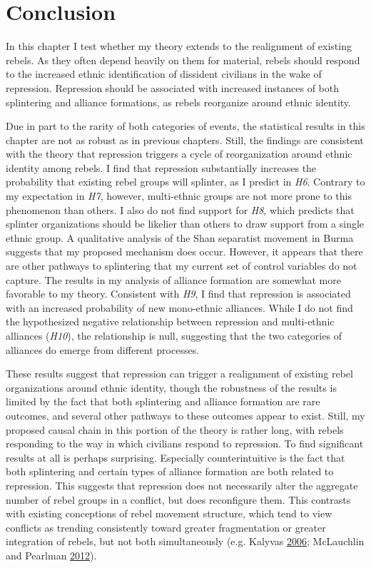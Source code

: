 \documentclass[12pt,]{book}
\theoremstyle{definition}
\theoremstyle{definition}
\theoremstyle{definition}
\theoremstyle{remark}
\begin{document}
\hypertarget{realignment-conclusion}{%
\section{Conclusion}\label{realignment-conclusion}}

In this chapter I test whether my theory extends to the realignment of
existing rebels. As they often depend heavily on them for material,
rebels should respond to the increased ethnic identification of
dissident civilians in the wake of repression. Repression should be
associated with increased instances of both splintering and alliance
formations, as rebels reorganize around ethnic identity.

Due in part to the rarity of both categories of events, the statistical
results in this chapter are not as robust as in previous chapters.
Still, the findings are consistent with the theory that repression
triggers a cycle of reorganization around ethnic identity among rebels.
I find that repression substantially increases the probability that
existing rebel groups will splinter, as I predict in \emph{H6}. Contrary
to my expectation in \emph{H7}, however, multi-ethnic groups are not
more prone to this phenomenon than others. I also do not find support
for \emph{H8}, which predicts that splinter organizations should be
likelier than others to draw support from a single ethnic group. A
qualitative analysis of the Shan separatist movement in Burma suggests
that my proposed mechanism does occur. However, it appears that there
are other pathways to splintering that my current set of control
variables do not capture. The results in my analysis of alliance
formation are somewhat more favorable to my theory. Consistent with
\emph{H9}, I find that repression is associated with an increased
probability of new mono-ethnic alliances. While I do not find the
hypothesized negative relationship between repression and multi-ethnic
alliances (\emph{H10}), the relationship is null, suggesting that the
two categories of alliances do emerge from different processes.

These results suggest that repression can trigger a realignment of
existing rebel organizations around ethnic identity, though the
robustness of the results is limited by the fact that both splintering
and alliance formation are rare outcomes, and several other pathways to
these outcomes appear to exist. Still, my proposed causal chain in this
portion of the theory is rather long, with rebels responding to the way
in which civilians respond to repression. To find significant results at
all is perhaps surprising. Especially counterintuitive is the fact that
both splintering and certain types of alliance formation are both
related to repression. This suggests that repression does not
necessarily alter the aggregate number of rebel groups in a conflict,
but does reconfigure them. This contrasts with existing conceptions of
rebel movement structure, which tend to view conflicts as trending
consistently toward greater fragmentation or greater integration of
rebels, but not both simultaneously (e.g. Kalyvas
\protect\hyperlink{ref-Kalyvas2006}{2006}; McLauchlin and Pearlman
\protect\hyperlink{ref-McLauchlin2012}{2012}).
\end{document}
